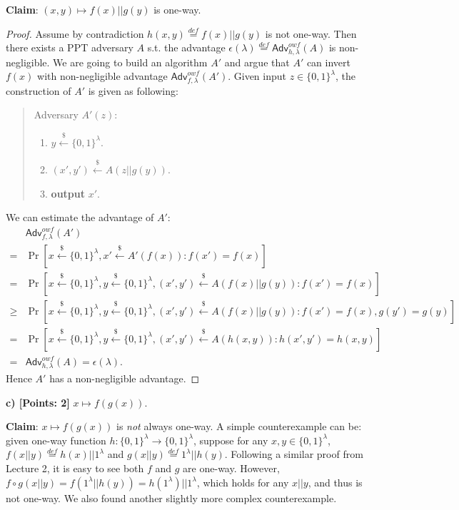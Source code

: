 \documentclass[12pt]{article}
\newcommand{\eqdef}{\stackrel{def}{=}}
\newcommand{\bits}{\{0,1\}}
\newcommand{\getsr}{\stackrel{\$}{\gets}}
\newcommand{\Adv}{\textsf{Adv}}
\theoremstyle{definition}
\begin{document}
{\bf Claim}: $(x, y) \mapsto f(x) || g(y)$ is one-way.
\begin{proof}
Assume by contradiction $h(x, y) \eqdef f(x) || g(y)$ is not one-way. Then there exists a PPT adversary $A$ s.t. the advantage $\epsilon(\lambda) \eqdef \Adv_{h,\lambda}^{owf}(A)$ is non-negligible. We are going to build an algorithm $A'$ and argue that $A'$ can invert $f(x)$ with non-negligible advantage $\Adv_{f,\lambda}^{owf}(A')$. Given input $z \in\bits^{\lambda}$, the construction of $A'$ is given as following:
\begin{quote}
Adversary $A' (z)$:
\begin{enumerate}
\item $y \getsr \bits^\lambda$.
\item $(x', y') \getsr A(z || g(y))$.
\item {\bf output} $x'$.
\end{enumerate}
\end{quote}
We can estimate the advantage of $A'$:
$$
\begin{aligned}
& \Adv_{f,\lambda}^{owf}(A') \\
=& \Pr[x\getsr \bits^\lambda, x' \getsr A'(f(x)) : f(x')=f(x)] \\
=& \Pr[x\getsr \bits^\lambda, y\getsr \bits^\lambda, (x', y') \getsr A(f(x) || g(y)) : f(x')=f(x)] \\
\geq & \Pr[x\getsr \bits^\lambda, y\getsr \bits^\lambda, (x', y') \getsr A(f(x) || g(y)) : f(x')=f(x), g(y')=g(y)] \\
=& \Pr[x\getsr \bits^\lambda, y\getsr \bits^\lambda, (x', y') \getsr A(h(x, y)) : h(x', y')=h(x, y)] \\
=& \Adv_{h,\lambda}^{owf}(A) = \epsilon(\lambda).
\end{aligned}
$$
Hence $A'$ has a non-negligible advantage.
\end{proof}

{\bf c) [Points: 2]} $x \mapsto f(g(x))$.

{\bf Claim}: $x \mapsto f(g(x))$ is \emph{not} always one-way. A simple counterexample can be: given one-way function $h : \bits^\lambda \to \bits^\lambda$, suppose for any $x,y \in \bits^\lambda$, $f(x||y) \eqdef h(x)||1^\lambda$ and $g(x||y) \eqdef 1^\lambda || h(y)$. Following a similar proof from Lecture 2, it is easy to see both $f$ and $g$ are one-way. However, $f \circ g (x||y) = f(1^\lambda||h(y)) = h(1^\lambda)||1^\lambda$, which holds for any $x||y$, and thus is not one-way. We also found another slightly more complex counterexample.
\end{document}
